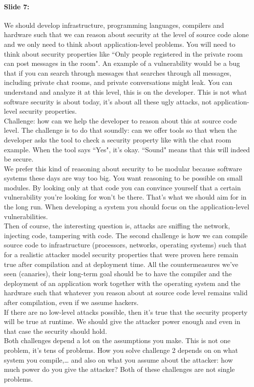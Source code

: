 \documentclass[10pt,a4paper]{report}
\begin{document}
\paragraph{Slide 7:} We should develop infrastructure, programming languages, compilers and hardware such that we can reason about security at the level of source code alone and we only need to think about application-level problems. You will need to think about security properties like ``Only people registered in the private room can post messages in the room". An example of a vulnerability would be a bug that if you can search through messages that searches through all messages, including private chat rooms, and private conversations might leak. You can understand and analyze it at this level, this is on the developer. This is not what software security is about today, it's about all these ugly attacks, not application-level security properties.\\
Challenge: how can we help the developer to reason about this at source code level. The challenge is to do that soundly: can we offer tools so that when the developer asks the tool to check a security property like with the chat room example. When the tool says ``Yes", it's okay. ``Sound" means that this will indeed be secure.\\
We prefer this kind of reasoning about security to be modular because software systems these days are way too big. You want reasoning to be possible on small modules. By looking only at that code you can convince yourself that a certain vulnerability you're looking for won't be there. That's what we should aim for in the long run. When developing a system you should focus on the application-level vulnerabilities.\\
Then of course, the interesting question is, attacks are sniffing the network, injecting code, tampering with code. The second challenge is how we can compile source code to infrastructure (processors, networks, operating systems) such that for a realistic attacker model security properties that were proven here remain true after compilation and at deployment time. All the countermeasures we've seen (canaries), their long-term goal should be to have the compiler and the deployment of an application work together with the operating system and the hardware such that whatever you reason about at source code level remains valid after compilation, even if we assume hackers.\\
If there are no low-level attacks possible, then it's true that the security property will be true at runtime. We should give the attacker power enough and even in that case the security should hold.\\
Both challenges depend a lot on the assumptions you make. This is not one problem, it's tens of problems. How you solve challenge 2 depends on on what system you compile,… and also on what you assume about the attacker: how much power do you give the attacker? Both of these challenges are not single problems.
\end{document}
